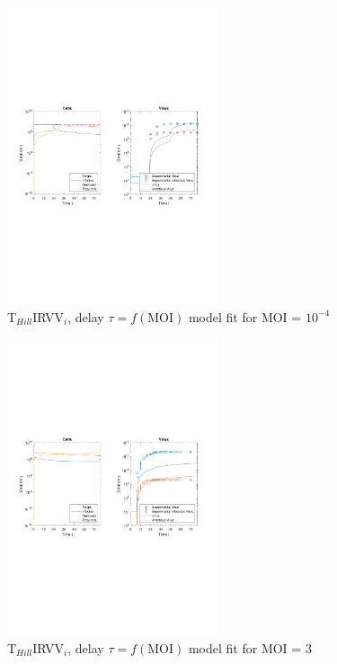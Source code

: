 \newpage

\begin{figure}[H]
\begin{center}
\includegraphics[width=0.55\textwidth, trim={1cm 9.5cm 1cm 9.5cm}, clip]{D_chapters/6_appendix/4_THillIRVViDelay/ModelTHillIRVViDelayDSNSaenz2010FittedMOI0.0001B0.0010133D0.55548P3247.2256C0.0027335TIC1896440.1965TH4.9813iFrac0.11736log.pdf}
\caption[T$_{Hill}$IRVV$_i$, delay $\tau = f(\text{MOI})$ model fit for MOI = $10^{-4}$]%
{T$_{Hill}$IRVV$_i$, delay $\tau = f(\text{MOI})$ model fit for MOI = $10^{-4}$}
\label{figure:THillIRVViDelayMOI00001}
\end{center}
\end{figure}

\begin{figure}[H]
\begin{center}
\includegraphics[width=0.55\textwidth, trim={1cm 9.5cm 1cm 9.5cm}, clip]{D_chapters/6_appendix/4_THillIRVViDelay/ModelTHillIRVViDelayDSNSaenz2010FittedMOI3B0.0010133D0.55548P3247.2256C0.0027335TIC1896440.1965TH4.9813iFrac0.11736log.pdf}
\caption[T$_{Hill}$IRVV$_i$, delay $\tau = f(\text{MOI})$ model fit for MOI = 3]%
{T$_{Hill}$IRVV$_i$, delay $\tau = f(\text{MOI})$ model fit for MOI = 3}
\label{figure:THillIRVViDelayMOI3}
\end{center}
\end{figure}

